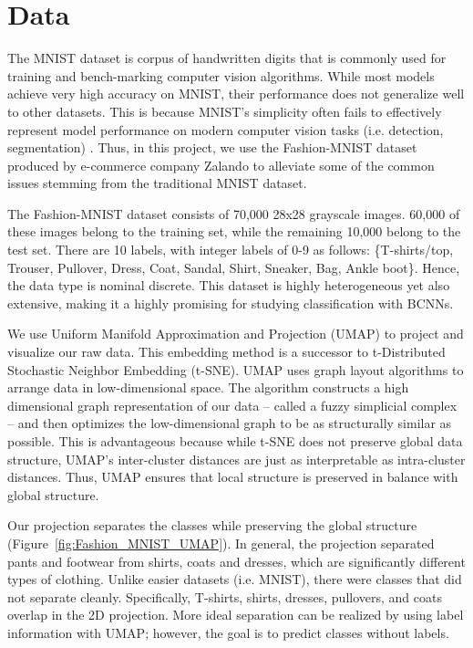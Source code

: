 \section{Data}

The MNIST dataset is corpus of handwritten digits that is commonly used for training and bench-marking computer vision algorithms. While most models achieve very high accuracy on MNIST, their performance does not generalize well to other datasets. This is because MNIST's simplicity often fails to effectively represent model performance on modern computer vision tasks (i.e. detection, segmentation) \cite{xiao2017/online}. Thus, in this project, we use the Fashion-MNIST dataset produced by e-commerce company Zalando to alleviate some of the common issues stemming from the traditional MNIST dataset. 

The Fashion-MNIST dataset consists of 70,000 28x28 grayscale images. 60,000 of these images belong to the training set, while the remaining 10,000 belong to the test set. There are 10 labels, with integer labels of 0-9 as follows: \{T-shirts/top, Trouser, Pullover, Dress, Coat, Sandal, Shirt, Sneaker, Bag, Ankle boot\}. Hence, the data type is nominal discrete. This dataset is highly heterogeneous yet also extensive, making it a highly promising for studying classification with BCNNs.

We use Uniform Manifold Approximation and Projection (UMAP) \cite{mcinnes2018umap-software} to project and visualize our raw data. This embedding method is a successor to t-Distributed Stochastic Neighbor Embedding (t-SNE). UMAP uses graph layout algorithms to arrange data in low-dimensional space. The algorithm constructs a high dimensional graph representation of our data – called a fuzzy simplicial complex – and then optimizes the low-dimensional graph to be as structurally similar as possible. This is advantageous because while t-SNE does not preserve global data structure, UMAP's inter-cluster distances are just as interpretable as intra-cluster distances. Thus, UMAP ensures that local structure is preserved in balance with global structure. 

Our projection separates the classes while preserving the global structure (Figure~\ref{fig:Fashion_MNIST_UMAP}). In general, the projection separated pants and footwear from shirts, coats and dresses, which are significantly different types of clothing. Unlike easier datasets (i.e. MNIST), there were classes that did not separate cleanly. Specifically, T-shirts, shirts, dresses, pullovers, and coats overlap in the 2D projection. More ideal separation can be realized by using label information with UMAP; however, the goal is to predict classes without labels.

